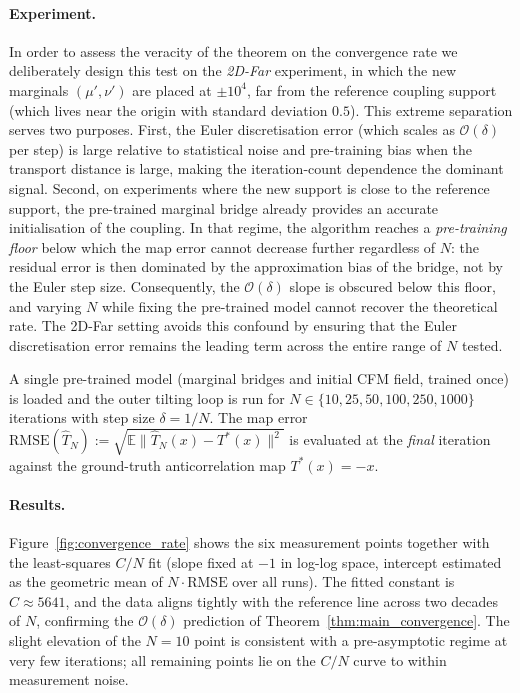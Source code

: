 \documentclass[11pt]{article}
\theoremstyle{definition}
\numberwithin{equation}{section}%
\begin{document}
\paragraph{Experiment.}
In order to assess the veracity of the theorem on the convergence rate we deliberately design this test on the \emph{2D-Far} experiment, in which the
new marginals $(\mu',\nu')$ are placed at $\pm 10^4$, far from the reference
coupling support (which lives near the origin with standard deviation $0.5$).
This extreme separation serves two purposes.
First, the Euler discretisation error (which scales as $\mathcal{O}(\delta)$ per
step) is large relative to statistical noise and pre-training bias when the
transport distance is large, making the iteration-count dependence the dominant
signal.
Second, on experiments where the new support is close to the reference support,
the pre-trained marginal bridge already provides an accurate initialisation of
the coupling.  In that regime, the algorithm reaches a \emph{pre-training floor}
below which the map error cannot decrease further regardless of $N$: the residual
error is then dominated by the approximation bias of the bridge, not by the Euler
step size.  Consequently, the $\mathcal{O}(\delta)$ slope is obscured below this
floor, and varying $N$ while fixing the pre-trained model cannot recover the
theoretical rate.
The 2D-Far setting avoids this confound by ensuring that the Euler
discretisation error remains the leading term across the entire range of $N$
tested.

A single pre-trained model (marginal bridges and initial CFM field, trained once)
is loaded and the outer tilting loop is run for $N \in \{10, 25, 50, 100, 250,
1000\}$ iterations with step size $\delta = 1/N$.
The map error $\mathrm{RMSE}(\hat{T}_N) := \sqrt{\mathbb{E}\|\hat{T}_N(x) -
T^*(x)\|^2}$ is evaluated at the \emph{final} iteration against the ground-truth
anticorrelation map $T^*(x) = -x$.

\paragraph{Results.}
Figure~\ref{fig:convergence_rate} shows the six measurement points together with
the least-squares $C/N$ fit (slope fixed at $-1$ in log-log space, intercept
estimated as the geometric mean of $N \cdot \mathrm{RMSE}$ over all runs).
The fitted constant is $C \approx 5641$, and the data aligns tightly with the
reference line across two decades of $N$, confirming the $\mathcal{O}(\delta)$
prediction of Theorem~\ref{thm:main_convergence}.
The slight elevation of the $N = 10$ point is consistent with a pre-asymptotic
regime at very few iterations; all remaining points lie on the $C/N$ curve to
within measurement noise.
\end{document}
